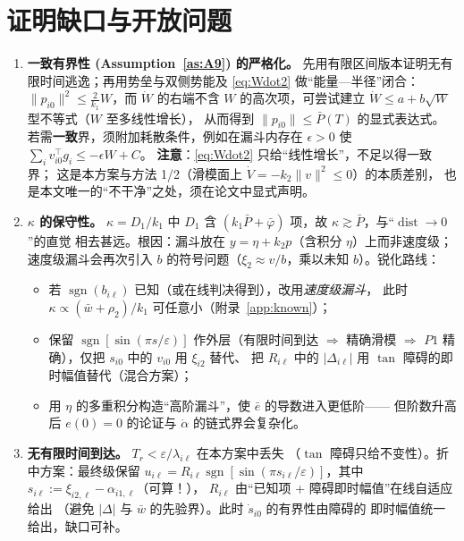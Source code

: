 \documentclass[11pt,a4paper]{article}
\newcommand{\sgn}{\operatorname{sgn}}
\newcommand{\dist}{\operatorname{dist}}
\theoremstyle{plain}
\theoremstyle{definition}
\theoremstyle{remark}
\begin{document}
\section{证明缺口与开放问题}\label{sec:gaps}
\begin{enumerate}[label=(\arabic*)]
\item \textbf{一致有界性 (Assumption~\ref{as:A9}) 的严格化。}
先用有限区间版本证明无有限时间逃逸；再用势垒与双侧势能及 \eqref{eq:Wdot2}
做“能量—半径”闭合：$\|p_{i0}\|^2\le\frac{2}{k_1}W$，而 $\dot W$ 的右端不含 $W$
的高次项，可尝试建立 $\dot W\le a+b\sqrt W$ 型不等式（$W$ 至多线性增长），
从而得到 $\|p_{i0}\|\le\bar P(T)$ 的显式表达式。
若需\textbf{一致}界，须附加耗散条件，例如在漏斗内存在 $\epsilon>0$ 使
$\sum_iv_{i0}^\top g_i\le-\epsilon W+C$。
\textbf{注意}：\eqref{eq:Wdot2} 只给“线性增长”，不足以得一致界；
这是本方案与方法 1/2（滑模面上 $\dot V=-k_2\|v\|^2\le0$）的本质差别，
也是本文唯一的“不干净”之处，须在论文中显式声明。

\item \textbf{$\kappa$ 的保守性。} $\kappa=D_1/k_1$ 中 $D_1$ 含
$(k_1\bar P+\bar\varphi)$ 项，故 $\kappa\gtrsim\bar P$，与“$\dist\to0$”的直觉
相去甚远。根因：漏斗放在 $y=\eta+k_2p$（含积分 $\eta$）上而非速度级；
速度级漏斗会再次引入 $b$ 的符号问题（$\xi_2\approx v/b$，乘以未知 $b$）。锐化路线：
\begin{itemize}
\item[(S1)] 若 $\sgn(b_{i\ell})$ 已知（或在线判决得到），改用\emph{速度级漏斗}，
此时 $\kappa\propto(\bar w+\rho_2)/k_1$ 可任意小（附录~\ref{app:known}）；
\item[(S2)] 保留 $\sgn[\sin(\pi s/\varepsilon)]$ 作外层（有限时间到达 $\Rightarrow$
精确滑模 $\Rightarrow$ $P1$ 精确），仅把 $s_{i0}$ 中的 $v_{i0}$ 用 $\xi_{i2}$ 替代、
把 $R_{i\ell}$ 中的 $|\Delta_{i\ell}|$ 用 $\tan$ 障碍的即时幅值替代（混合方案）；
\item[(S3)] 用 $\eta$ 的多重积分构造“高阶漏斗”，使 $\bar e$ 的导数进入更低阶——
但阶数升高后 $e(0)=0$ 的论证与 $\dot\alpha$ 的链式界会复杂化。
\end{itemize}

\item \textbf{无有限时间到达。} $T_r<\varepsilon/\lambda_{i\ell}$ 在本方案中丢失
（$\tan$ 障碍只给不变性）。折中方案：最终级保留
$u_{i\ell}=R_{i\ell}\sgn[\sin(\pi s_{i\ell}/\varepsilon)]$，其中
$s_{i\ell}:=\xi_{i2,\ell}-\alpha_{i1,\ell}$（可算！），
$R_{i\ell}$ 由“已知项 + 障碍即时幅值”在线自适应给出
（避免 $|\Delta|$ 与 $\bar w$ 的先验界）。此时 $\dot s_{i0}$ 的有界性由障碍的
即时幅值统一给出，缺口可补。


\end{enumerate}
\end{document}

